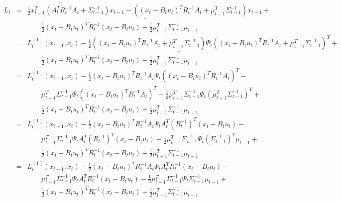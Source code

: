 \documentclass[dvipdfmx,a4paper]{jsarticle}
\begin{document}
\begin{eqnarray}
	L_t &=& \underline{\frac{1}{2} x_{t - 1}^T \left( A_t^T R_t^{-1} A_t + \Sigma_{t - 1}^{-1} \right) x_{t - 1} - \left( \left( x_t - B_t u_t \right)^T R_t^{-1} A_t + \mu_{t - 1}^T \Sigma_{t - 1}^{-1} \right) x_{t - 1}} + \nonumber \\
	&& \qquad \frac{1}{2} \left( x_t - B_t u_t \right)^T R_t^{-1} \left( x_t - B_t u_t \right) + \frac{1}{2} \mu_{t - 1}^T \Sigma_{t - 1}^{-1} \mu_{t - 1} \nonumber \\
	&=& \underline{L_t^{(1)}(x_{t - 1}, x_t) - \frac{1}{2} \left( \left( x_t - B_t u_t \right)^T R_t^{-1} A_t + \mu_{t - 1}^T \Sigma_{t - 1}^{-1} \right) \Psi_t \left( \left( x_t - B_t u_t \right)^T R_t^{-1} A_t + \mu_{t - 1}^T \Sigma_{t - 1}^{-1} \right)^T} + \nonumber \\
	&& \qquad \frac{1}{2} \left( x_t - B_t u_t \right)^T R_t^{-1} \left( x_t - B_t u_t \right) + \frac{1}{2} \mu_{t - 1}^T \Sigma_{t - 1}^{-1} \mu_{t - 1} \nonumber \\
	&=& L_t^{(1)}(x_{t - 1}, x_t) - \frac{1}{2} \left( x_t - B_t u_t \right)^T R_t^{-1} A_t \Psi_t \left( \left( x_t - B_t u_t \right)^T R_t^{-1} A_t \right)^T - \nonumber \\
	&& \qquad \mu_{t - 1}^T \Sigma_{t - 1}^{-1} \Psi_t \left( \left( x_t - B_t u_t \right)^T R_t^{-1} A_t \right)^T - \frac{1}{2} \mu_{t - 1}^T \Sigma_{t - 1}^{-1} \Psi_t \left( \mu_{t - 1}^T \Sigma_{t - 1}^{-1} \right)^T + \nonumber \\
	&& \qquad \frac{1}{2} \left( x_t - B_t u_t \right)^T R_t^{-1} \left( x_t - B_t u_t \right) + \frac{1}{2} \mu_{t - 1}^T \Sigma_{t - 1}^{-1} \mu_{t - 1} \nonumber \\
	&=& L_t^{(1)}(x_{t - 1}, x_t) - \frac{1}{2} \left( x_t - B_t u_t \right)^T R_t^{-1} A_t \Psi_t A_t^T \left( R_t^{-1} \right)^T \left( x_t - B_t u_t \right) - \nonumber \\
	&& \qquad \mu_{t - 1}^T \Sigma_{t - 1}^{-1} \Psi_t A_t^T \left( R_t^{-1} \right)^T \left( x_t - B_t u_t \right) - \frac{1}{2} \mu_{t - 1}^T \Sigma_{t - 1}^{-1} \Psi_t \left( \Sigma_{t - 1}^{-1} \right)^T \mu_{t - 1} + \nonumber \\
	&& \qquad \frac{1}{2} \left( x_t - B_t u_t \right)^T R_t^{-1} \left( x_t - B_t u_t \right) + \frac{1}{2} \mu_{t - 1}^T \Sigma_{t - 1}^{-1} \mu_{t - 1} \nonumber \\
	&=& L_t^{(1)}(x_{t - 1}, x_t) - \frac{1}{2} \left( x_t - B_t u_t \right)^T R_t^{-1} A_t \Psi_t A_t^T R_t^{-1} \left( x_t - B_t u_t \right) - \nonumber \\
	&& \qquad \mu_{t - 1}^T \Sigma_{t - 1}^{-1} \Psi_t A_t^T R_t^{-1} \left( x_t - B_t u_t \right) - \frac{1}{2} \mu_{t - 1}^T \Sigma_{t - 1}^{-1} \Psi_t \Sigma_{t - 1}^{-1} \mu_{t - 1} + \nonumber \\
	&& \qquad \frac{1}{2} \left( x_t - B_t u_t \right)^T R_t^{-1} \left( x_t - B_t u_t \right) + \frac{1}{2} \mu_{t - 1}^T \Sigma_{t - 1}^{-1} \mu_{t - 1}
\end{eqnarray}
\end{document}
